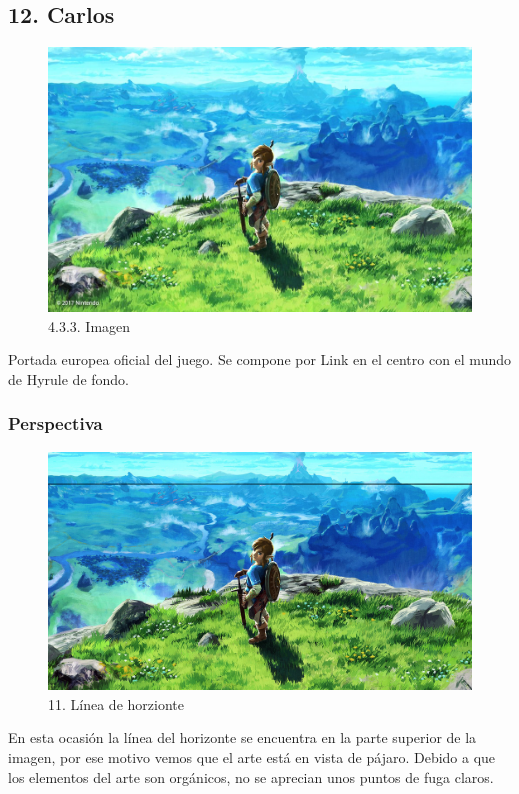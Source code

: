 \documentclass[12pt]{article}
\begin{document}
\subsection{12. Carlos}
  \begin{figure}[H]
    \centering
    \includegraphics[width=\textwidth]{images/Concepts/12_concept_art.jpg}
    \caption{\small 4.3.3. Imagen}
  \end{figure}
  Portada europea oficial del juego. Se compone por Link en el centro con el mundo de Hyrule de fondo.

          \subsubsection{Perspectiva}
          \begin{figure}[H]
    \centering
    \includegraphics[width=\textwidth]{images/Carlos/15/Horizonte.jpg}
    \caption{\small 11. Línea de horzionte}
  \end{figure}
  En esta ocasión la línea del horizonte se encuentra en la parte superior de la imagen, por ese motivo vemos que el arte está en vista de pájaro. Debido a que los elementos del arte son orgánicos, no se aprecian unos puntos de fuga claros.
\end{document}
